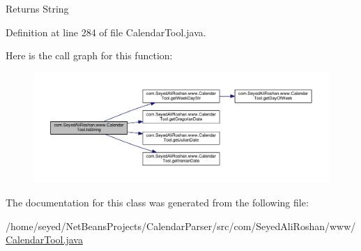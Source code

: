 \begin{DoxyReturn}{Returns}
String 
\end{DoxyReturn}


Definition at line 284 of file Calendar\+Tool.\+java.



Here is the call graph for this function\+:
\nopagebreak
\begin{figure}[H]
\begin{center}
\leavevmode
\includegraphics[width=350pt]{classcom_1_1_seyed_ali_roshan_1_1www_1_1_calendar_tool_ad236b0b986cfd9a5d4c62c1fd2b3e836_cgraph}
\end{center}
\end{figure}




The documentation for this class was generated from the following file\+:\begin{DoxyCompactItemize}
\item 
/home/seyed/\+Net\+Beans\+Projects/\+Calendar\+Parser/src/com/\+Seyed\+Ali\+Roshan/www/\hyperlink{_calendar_tool_8java}{Calendar\+Tool.\+java}\end{DoxyCompactItemize}
